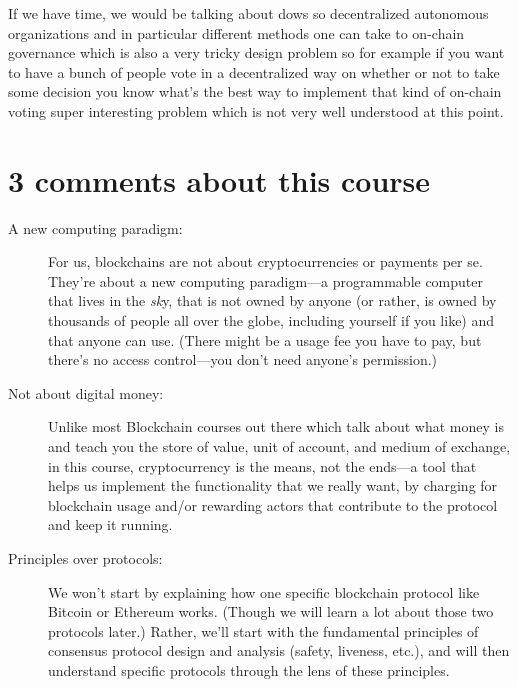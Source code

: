 If we have time, we would be talking about
dows so decentralized autonomous
organizations
and in particular different methods one
can take to on-chain governance which is
also a very tricky design problem so for
example if you want to have a bunch of
people vote in a decentralized way on
whether or not to take some decision you
know what's the best way to implement
that kind of on-chain voting super
interesting problem which is not 
very well understood at this point.\\


\section{3 comments about this course}
\begin{description}
    \item[A new computing paradigm:] For us, blockchains are not about cryptocurrencies or
payments per se. They’re about a new computing paradigm—a programmable computer
that lives in the \textit{sk}y, that is not owned by anyone (or rather, is owned by thousands of
people all over the globe, including yourself if you like) and that anyone can use. (There
might be a usage fee you have to pay, but there’s no access control—you don’t need anyone’s
permission.)

    \item[Not about digital money:] Unlike most Blockchain courses out there which talk about what money is and teach you the store of value, unit of account, and medium of exchange, in this course, cryptocurrency is the means, not the ends—a tool that
helps us implement the functionality that we really want, by charging for blockchain usage and/or rewarding actors that contribute to the protocol and keep it running.

    \item[Principles over protocols:] We won’t start by explaining how one specific blockchain
protocol like Bitcoin or Ethereum works. (Though we will learn a lot about those two
protocols later.) Rather, we’ll start with the fundamental principles of consensus protocol
design and analysis (safety, liveness, etc.), and will then understand specific protocols through
the lens of these principles.

\end{description}


